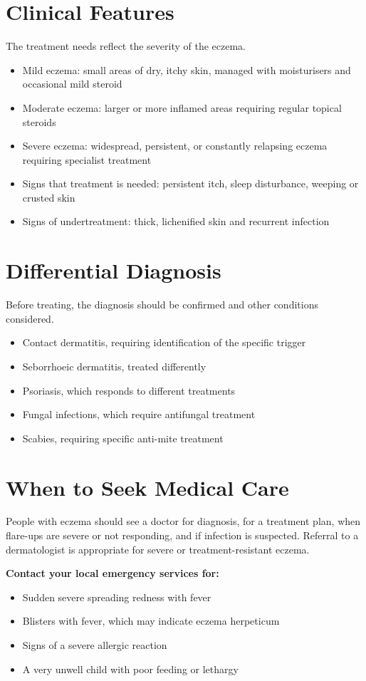 \section*{Clinical Features}
The treatment needs reflect the severity of the eczema.
\begin{itemize}
    \item Mild eczema: small areas of dry, itchy skin, managed with moisturisers and occasional mild steroid
    \item Moderate eczema: larger or more inflamed areas requiring regular topical steroids
    \item Severe eczema: widespread, persistent, or constantly relapsing eczema requiring specialist treatment
    \item Signs that treatment is needed: persistent itch, sleep disturbance, weeping or crusted skin
    \item Signs of undertreatment: thick, lichenified skin and recurrent infection
\end{itemize}

\section*{Differential Diagnosis}
Before treating, the diagnosis should be confirmed and other conditions considered.
\begin{itemize}
    \item Contact dermatitis, requiring identification of the specific trigger
    \item Seborrhoeic dermatitis, treated differently
    \item Psoriasis, which responds to different treatments
    \item Fungal infections, which require antifungal treatment
    \item Scabies, requiring specific anti-mite treatment
\end{itemize}

\section*{When to Seek Medical Care}
People with eczema should see a doctor for diagnosis, for a treatment plan, when flare-ups are severe or not responding, and if infection is suspected. Referral to a dermatologist is appropriate for severe or treatment-resistant eczema.

\textbf{Contact your local emergency services for:}
\begin{itemize}
    \item Sudden severe spreading redness with fever
    \item Blisters with fever, which may indicate eczema herpeticum
    \item Signs of a severe allergic reaction
    \item A very unwell child with poor feeding or lethargy
\end{itemize}

